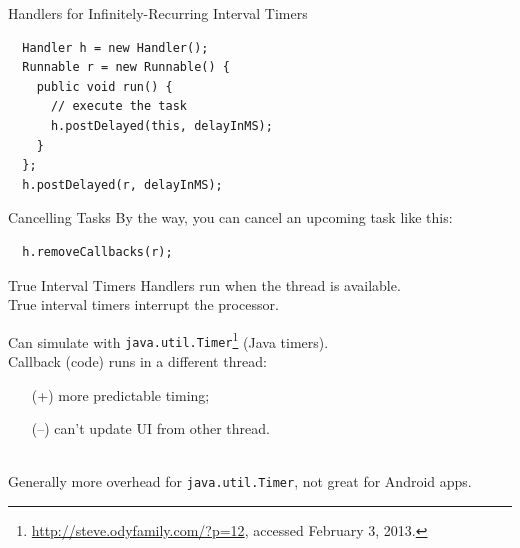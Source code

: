 \documentclass[aspectratio=169]{beamer}
\begin{document}
\begin{frame}[fragile]{Handlers for Infinitely-Recurring Interval Timers}
\begin{Verbatim}
  Handler h = new Handler();
  Runnable r = new Runnable() {
    public void run() {
      // execute the task
      h.postDelayed(this, delayInMS);
    }
  };
  h.postDelayed(r, delayInMS);
\end{Verbatim}
\end{frame}




\begin{frame}[fragile]{Cancelling Tasks}
By the way, you can cancel an upcoming task like this:
\begin{Verbatim}
  h.removeCallbacks(r);
\end{Verbatim}
\end{frame}




\begin{frame}{True Interval Timers}
\large
Handlers run when the thread is available.\\[1em]

True interval timers interrupt the processor.

Can simulate with {\tt java.util.Timer}\footnote{\url{http://steve.odyfamily.com/?p=12}, accessed
  February 3, 2013.} (Java timers). \\[1em]

Callback (code) runs in a different thread:
\begin{itemize}
\item[(+)] more predictable timing;
\item[(--)] can't update UI from other thread.
\end{itemize}
~\\
Generally more overhead for {\tt java.util.Timer}, not great for Android apps.
\vspace{1em}
\end{frame}
\end{document}
